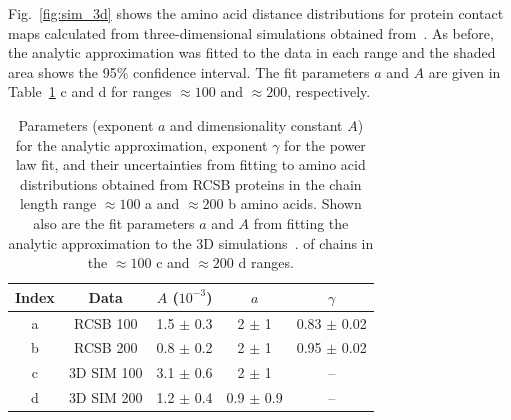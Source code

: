 \documentclass[notitlepage,
reprint,%
onecolumn,
amsmath,amssymb,superscriptaddress,aps,
pre,floatfix]{revtex4-1}
\begin{document}
Fig.~\ref{fig:sim_3d} shows the amino acid distance distributions for protein contact maps calculated from three-dimensional simulations obtained from~\cite{molkenthin2020self}. As before, the analytic approximation was fitted to the data in each range and the shaded area shows the 95\% confidence interval. The fit parameters $a$ and $A$ are given in Table~\ref{table:stats} c and d for ranges $\approx100$ and $\approx200$, respectively.

\begin{table}[tb]
\centering
\begin{tabular}{|c c c c c |}
\hline
Index & Data  & $A$ ($10^{-3}$) & $a$ & $\gamma$ \\
\hline
a & RCSB 100 & 1.5 $\pm$ 0.3  & 2 $\pm$ 1 &  0.83 $\pm$ 0.02\\
b & RCSB 200 & 0.8 $\pm$ 0.2 & 2 $\pm$ 1 & 0.95 $\pm$ 0.02 \\
c & 3D SIM 100 & 3.1 $\pm$ 0.6 & 2 $\pm$ 1 & --  \\
d & 3D SIM 200 & 1.2 $\pm$ 0.4 & 0.9 $\pm$ 0.9  & --  \\
\hline
\end{tabular}
 \caption{Parameters (exponent $a$ and dimensionality constant $A$) for the analytic approximation, exponent $\gamma$ for the power law fit, and their uncertainties from fitting to amino acid distributions obtained from RCSB proteins in the chain length range $\approx100$ a and $\approx200$ b amino acids. Shown also are the fit parameters $a$ and $A$ from fitting the analytic approximation to the 3D simulations~\cite{molkenthin2020self}. of chains in the $\approx100$ c and $\approx200$ d ranges.}
\label{table:stats}
\end{table}
\end{document}
